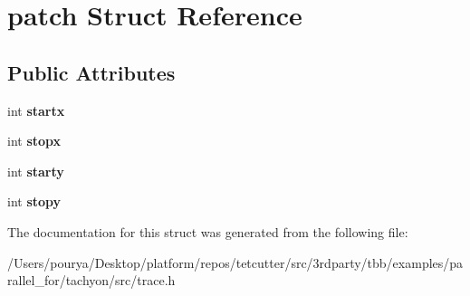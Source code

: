 \hypertarget{structpatch}{}\section{patch Struct Reference}
\label{structpatch}
\subsection*{Public Attributes}
\begin{DoxyCompactItemize}
\item 
\hypertarget{structpatch_aa4100ce776ab59d79bec797c6ae99b27}{}int {\bfseries startx}\label{structpatch_aa4100ce776ab59d79bec797c6ae99b27}

\item 
\hypertarget{structpatch_a7e9bbea14ecc3983b1247b02899b7234}{}int {\bfseries stopx}\label{structpatch_a7e9bbea14ecc3983b1247b02899b7234}

\item 
\hypertarget{structpatch_a9c0b488845974b539c0860a162a86b00}{}int {\bfseries starty}\label{structpatch_a9c0b488845974b539c0860a162a86b00}

\item 
\hypertarget{structpatch_a22c48eb2e0c0ca61bca4f9d610e45f24}{}int {\bfseries stopy}\label{structpatch_a22c48eb2e0c0ca61bca4f9d610e45f24}

\end{DoxyCompactItemize}


The documentation for this struct was generated from the following file\+:\begin{DoxyCompactItemize}
\item 
/\+Users/pourya/\+Desktop/platform/repos/tetcutter/src/3rdparty/tbb/examples/parallel\+\_\+for/tachyon/src/trace.\+h\end{DoxyCompactItemize}
